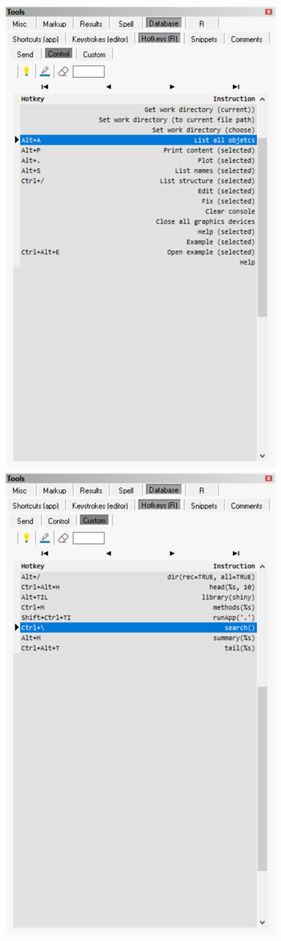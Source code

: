 \begin{figure}[H]
  \includegraphics[scale=0.45]{./res/tools_database_rh_control.png}~~
  \includegraphics[scale=0.45]{./res/tools_database_rh_custom.png}~~

\end{figure}

